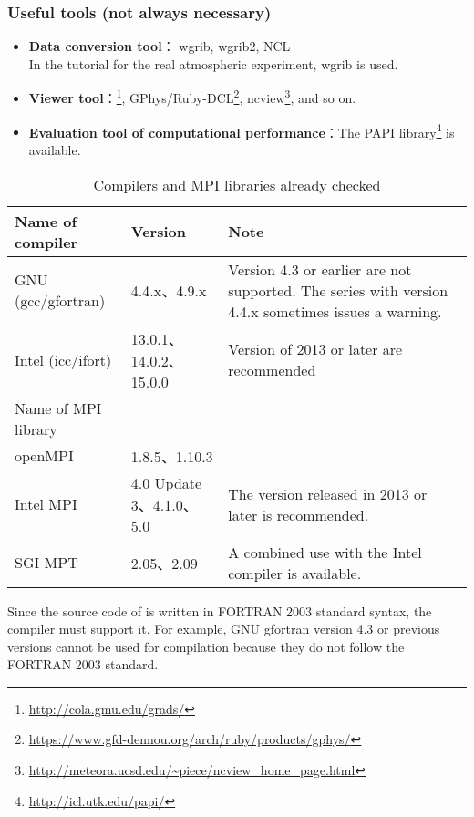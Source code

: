 \subsubsection{Useful tools (not always necessary)}
\begin{itemize}
  \item {\bf Data conversion tool}： wgrib, wgrib2, NCL\\
  In the tutorial for the real atmospheric experiment, wgrib is used.
  \item {\bf Viewer tool}：\grads \footnote{\url{http://cola.gmu.edu/grads/}},
  GPhys/Ruby-DCL\footnote{\url{https://www.gfd-dennou.org/arch/ruby/products/gphys/}},
  ncview\footnote{\url{http://meteora.ucsd.edu/~piece/ncview\_home\_page.html}}, and so on.
  \item {\bf Evaluation tool of computational performance}：The PAPI library\footnote{\url{http://icl.utk.edu/papi/}} is available.
\end{itemize}


\begin{table}[tb]
\begin{center}
\caption{Compilers and MPI libraries already checked}
\begin{tabularx}{150mm}{|l|l|X|} \hline
 \rowcolor[gray]{0.9} Name of compiler & Version & Note \\ \hline
 GNU (gcc/gfortran)    & 4.4.x、4.9.x           & Version 4.3 or earlier are not supported. The series with version 4.4.x sometimes issues a warning. \\ \hline
 Intel (icc/ifort)     & 13.0.1、14.0.2、15.0.0  & Version of 2013 or later are recommended \\ \hline
 \rowcolor[gray]{0.9} Name of MPI library &  &  \\ \hline
 openMPI   & 1.8.5、1.10.3            & \\ \hline
 Intel MPI & 4.0 Update 3、4.1.0、5.0 & The version released in 2013 or later is recommended.\\ \hline
 SGI MPT   & 2.05、2.09               & A combined use with the Intel compiler is available. \\ \hline
\end{tabularx}
\label{tab:compatible_compiler}
\end{center}
\end{table}

Since the source code of \scalelib is  written in FORTRAN 2003 standard syntax, the compiler must support it. For example, GNU gfortran version 4.3 or previous versions cannot be used for \scalelib compilation because they do not follow the FORTRAN 2003 standard.

